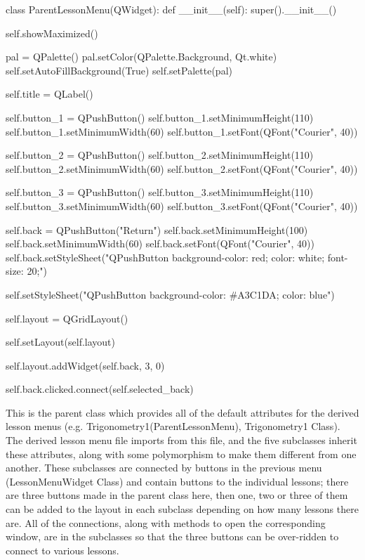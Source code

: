 \begin{python}
class ParentLessonMenu(QWidget):
    def __init__(self):
        super().__init__()

        self.showMaximized()

        pal = QPalette()
        pal.setColor(QPalette.Background, Qt.white)
        self.setAutoFillBackground(True)
        self.setPalette(pal)

        self.title = QLabel()

        self.button_1 = QPushButton()
        self.button_1.setMinimumHeight(110)
        self.button_1.setMinimumWidth(60)
        self.button_1.setFont(QFont("Courier", 40))
        
        self.button_2 = QPushButton()
        self.button_2.setMinimumHeight(110)
        self.button_2.setMinimumWidth(60)
        self.button_2.setFont(QFont("Courier", 40))
        
        self.button_3 = QPushButton()
        self.button_3.setMinimumHeight(110)
        self.button_3.setMinimumWidth(60)
        self.button_3.setFont(QFont("Courier", 40))
   
        self.back = QPushButton("Return")
        self.back.setMinimumHeight(100)
        self.back.setMinimumWidth(60)
        self.back.setFont(QFont("Courier", 40))
        self.back.setStyleSheet("QPushButton {background-color: red; color: white; font-size: 20;}")

        self.setStyleSheet("QPushButton {background-color: #A3C1DA; color: blue}")

        self.layout = QGridLayout()

        self.setLayout(self.layout)

        self.layout.addWidget(self.back, 3, 0)

        self.back.clicked.connect(self.selected_back)
\end{python}

This is the parent class which provides all of the default attributes for the derived lesson menus (e.g. Trigonometry1(ParentLessonMenu), Trigonometry1 Class). The derived lesson menu file imports from this file, and the five subclasses inherit these attributes, along with some polymorphism to make them different from one another. These subclasses are connected by buttons in the previous menu (LessonMenuWidget Class) and contain buttons to the individual lessons; there are three buttons made in the parent class here, then  one, two or three of them can be added to the layout in each subclass depending on how many lessons there are. All of the connections, along with methods to open the corresponding window, are in the subclasses so that the three buttons can be over-ridden to connect to various lessons.

